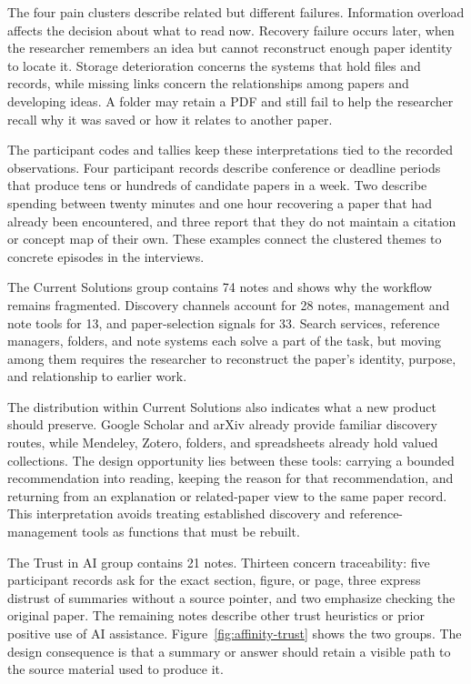 The four pain clusters describe related but different failures.  Information
overload affects the decision about what to read now.  Recovery failure occurs
later, when the researcher remembers an idea but cannot reconstruct enough
paper identity to locate it.  Storage deterioration concerns the systems that
hold files and records, while missing links concern the relationships among
papers and developing ideas.  A folder may retain a PDF and still fail to help
the researcher recall why it was saved or how it relates to another paper.

The participant codes and tallies keep these interpretations tied to the
recorded observations.  Four participant records describe conference or
deadline periods that produce tens or hundreds of candidate papers in a week.
Two describe spending between twenty minutes and one hour recovering a paper
that had already been encountered, and three report that they do not maintain
a citation or concept map of their own.  These examples connect the clustered
themes to concrete episodes in the interviews.

The Current Solutions group contains 74 notes and shows why the workflow
remains fragmented.  Discovery channels account for 28 notes, management and
note tools for 13, and paper-selection signals for 33.  Search services,
reference managers, folders, and note systems each solve a part of the task,
but moving among them requires the researcher to reconstruct the paper's
identity, purpose, and relationship to earlier work.

The distribution within Current Solutions also indicates what a new product
should preserve.  Google Scholar and arXiv already provide familiar discovery
routes, while Mendeley, Zotero, folders, and spreadsheets already hold valued
collections.  The design opportunity lies between these tools: carrying a
bounded recommendation into reading, keeping the reason for that
recommendation, and returning from an explanation or related-paper view to the
same paper record.  This interpretation avoids treating established discovery
and reference-management tools as functions that must be rebuilt.

The Trust in AI group contains 21 notes.  Thirteen concern traceability: five
participant records ask for the exact section, figure, or page, three express
distrust of summaries without a source pointer, and two emphasize checking the
original paper.  The remaining notes describe other trust heuristics or prior
positive use of AI assistance.  Figure~\ref{fig:affinity-trust} shows the two
groups.  The design consequence is that a summary or answer should retain a
visible path to the source material used to produce it.

